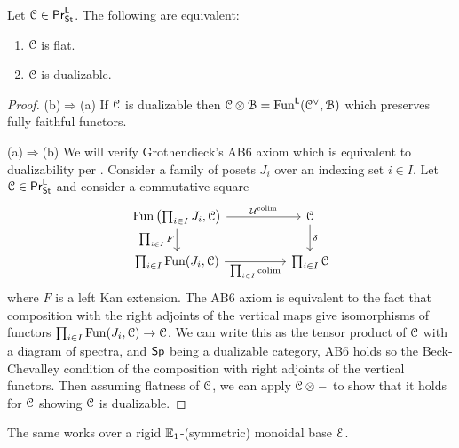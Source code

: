 \begin{theorem}
    Let $\EuScript{C}\in\mathsf{Pr}^{\mathsf{L}}_{\mathsf{St}}$. The following are equivalent:
    \begin{enumerate}[label=(\alph*)]
        \item $\EuScript{C}$ is flat. 
        \item $\EuScript{C}$ is dualizable. 
    \end{enumerate}
\end{theorem}
\begin{proof}
    (b)$\Rightarrow$(a) If $\EuScript{C}$ is dualizable then $\EuScript{C}\otimes\EuScript{B}=\mathrm{Fun}^{\mathsf{L}}(\EuScript{C}^{\vee},\EuScript{B})$ which preserves fully faithful functors. 

    (a)$\Rightarrow$(b) We will verify Grothendieck's AB6 axiom which is equivalent to dualizability per . Consider a family of posets $J_{i}$ over an indexing set $i\in I$. Let $\EuScript{C}\in\mathsf{Pr}^{\mathsf{L}}_{\mathsf{St}}$ and consider a commutative square 
    $$%
    \begin{tikzcd}
        {\Fun\left(\prod_{i\in I}J_{i},\Cscr\right)} && \Cscr \\
        {\prod_{i\in I}\Fun(J_{i},\Cscr)} && {\prod_{i\in I}\Cscr}
        \arrow["{\Ucal^{\colim}}", from=1-1, to=1-3]
        \arrow["{\prod_{i\in I}F}"', from=1-1, to=2-1]
        \arrow["\delta", from=1-3, to=2-3]
        \arrow["{\prod_{i\in I}\colim}"', from=2-1, to=2-3]
    \end{tikzcd}$$
    where $F$ is a left Kan extension. The AB6 axiom is equivalent to the fact that composition with the right adjoints of the vertical maps give isomorphisms of functors $\prod_{i\in I}\mathrm{Fun}(J_{i},\EuScript{C})\to\EuScript{C}$. We can write this as the tensor product of $\EuScript{C}$ with a diagram of spectra, and $\mathsf{Sp}$ being a dualizable category, AB6 holds so the Beck-Chevalley condition of the composition with right adjoints of the vertical functors. Then assuming flatness of $\EuScript{C}$, we can apply $\EuScript{C}\otimes-$ to show that it holds for $\EuScript{C}$ showing $\EuScript{C}$ is dualizable. 
\end{proof}
\begin{remark}
    The same works over a rigid $\mathbb{E}_{1}$-(symmetric) monoidal base $\EuScript{E}$.
\end{remark}
